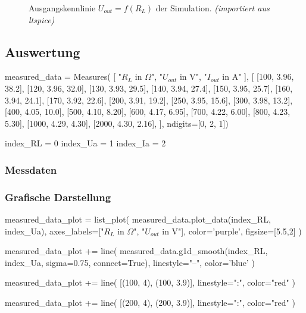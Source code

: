 \begin{figure}[H]
    \centering
    \caption{Ausgangskennlinie \textbf{$U_{out} = f(R_L)$} der Simulation. \textit{(importiert aus ltspice)}}
\end{figure}

\subsection{Auswertung}

\begin{sagesilent}
    measured_data = Measures(
        [
            "$R_L$ in $\Omega$",
            "$U_{out}$ in V", 
            "$I_{out}$ in A"
        ], [
            [100, 3.96, 38.2],
            [120, 3.96, 32.0],
            [130, 3.93, 29.5],
            [140, 3.94, 27.4],
            [150, 3.95, 25.7],
            [160, 3.94, 24.1],
            [170, 3.92, 22.6],
            [200, 3.91, 19.2],
            [250, 3.95, 15.6],
            [300, 3.98, 13.2],
            [400, 4.05, 10.0],
            [500, 4.10, 8.20],
            [600, 4.17, 6.95],
            [700, 4.22, 6.00],
            [800, 4.23, 5.30],
            [1000, 4.29, 4.30],
            [2000, 4.30, 2.16],
    ], ndigits=[0, 2, 1])

    index_RL = 0
    index_Ua = 1
    index_Ia = 2
\end{sagesilent}

\subsubsection{Messdaten}

\begin{table}[H]
    \centering
    \renewcommand{\arraystretch}{1.2}
\end{table}

\subsubsection{Grafische Darstellung}

\begin{sagesilent}
    measured_data_plot = list_plot(
        measured_data.plot_data(index_RL, index_Ua),
        axes_labels=["$R_L$ in $\Omega$", "$U_{out}$ in V"],
        color='purple',
        figsize=[5.5,2]
    )

    measured_data_plot += line(
        measured_data.g1d_smooth(index_RL, index_Ua, sigma=0.75, connect=True),
        linestyle="--",
        color='blue'
    )

    measured_data_plot += line(
        [(100, 4), (100, 3.9)],
        linestyle=":",
        color="red"
    )

    measured_data_plot += line(
        [(200, 4), (200, 3.9)],
        linestyle=":",
        color="red"
    )
\end{sagesilent}

